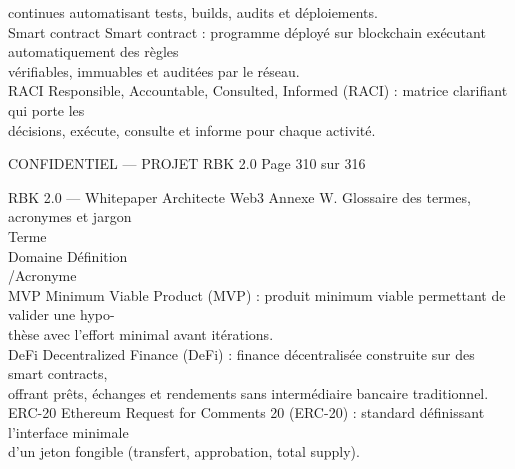 \documentclass[12pt,landscape,a4paper]{article}
\newenvironment{confidential}
{\begin{tcolorbox}[
    colback=rbkred!5!white,
    colframe=rbkred!75!black,
    title=CONFIDENTIEL,
    fonttitle=\bfseries\color{white},
    coltitle=rbkred!75!black,
    breakable,
    enhanced,
    frame hidden,
    borderline west={2pt}{0pt}{rbkred!75!black}
]}
{\end{tcolorbox}}
\begin{document}
continues automatisant tests, builds, audits et déploiements.\\
\vspace{0.5em}
Smart contract                          Smart contract : programme déployé sur blockchain exécutant automatiquement des règles\\
vérifiables, immuables et auditées par le réseau.\\
\vspace{0.5em}
RACI                                    Responsible, Accountable, Consulted, Informed (RACI) : matrice clarifiant qui porte les\\
décisions, exécute, consulte et informe pour chaque activité.\\
\vspace{0.5em}
\vspace{0.5em}
\vspace{0.5em}
\vspace{0.5em}
\begin{confidential}CONFIDENTIEL — PROJET RBK 2.0                    Page 310 sur 316\end{confidential}
RBK 2.0 — Whitepaper Architecte Web3                                                  Annexe W. Glossaire des termes, acronymes et jargon\\
\vspace{0.5em}
\vspace{0.5em}
Terme\\
Domaine    Définition\\
/Acronyme\\
MVP                                         Minimum Viable Product (MVP) : produit minimum viable permettant de valider une hypo-\\
thèse avec l’effort minimal avant itérations.\\
\vspace{0.5em}
DeFi                                        Decentralized Finance (DeFi) : finance décentralisée construite sur des smart contracts,\\
offrant prêts, échanges et rendements sans intermédiaire bancaire traditionnel.\\
\vspace{0.5em}
ERC-20                                      Ethereum Request for Comments 20 (ERC-20) : standard définissant l’interface minimale\\
d’un jeton fongible (transfert, approbation, total supply).\\
\vspace{0.5em}
\end{document}

